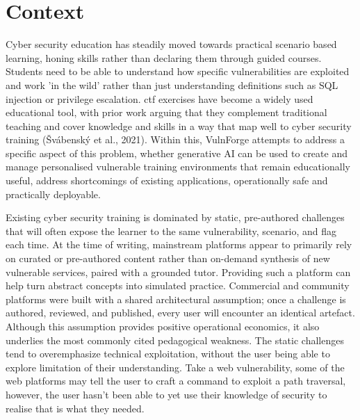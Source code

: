%

\section{Context}\label{sec:context}

Cyber security education has steadily moved towards practical scenario based learning, honing skills rather than declaring them through guided courses. Students need to be able to understand how specific vulnerabilities are exploited and work 'in the wild' rather than just understanding definitions such as SQL injection or privilege escalation. \gls{ctf} exercises have become a widely used educational tool, with prior work arguing that they complement traditional teaching and cover knowledge and skills in a way that map well to cyber security training (Švábenský et al., 2021)\cite{svabensky_cybersecurity_2021}. Within this, VulnForge attempts to address a specific aspect of this problem, whether generative AI can be used to create and manage personalised vulnerable training environments that remain educationally useful, address shortcomings of existing applications, operationally safe and practically deployable.

Existing cyber security training is dominated by static, pre-authored challenges that will often expose the learner to the same vulnerability, scenario, and flag each time. At the time of writing, mainstream platforms appear to primarily rely on curated or pre-authored content rather than on-demand synthesis of new vulnerable services, paired with a grounded tutor. Providing such a platform can help turn abstract concepts into simulated practice. Commercial and community platforms were built with a shared architectural assumption; once a challenge is authored, reviewed, and published, every user will encounter an identical artefact. Although this assumption provides positive operational economics, it also underlies the most commonly cited pedagogical weakness. The static challenges tend to overemphasize technical exploitation, without the user being able to explore limitation of their understanding. Take a web vulnerability, some of the web platforms may tell the user to craft a command to exploit a path traversal\cite{noauthor_cwe_nodate}, however, the user hasn't been able to yet use their knowledge of security to realise that is what they needed. 

